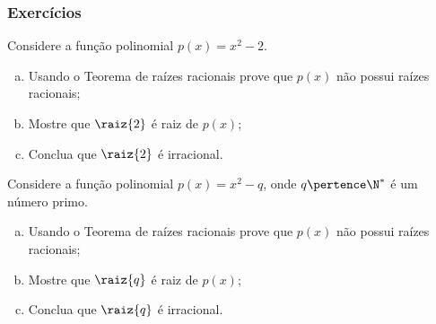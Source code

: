 \begin{frame}
\frametitle{Exercícios} 








\begin{exercise}
	Considere a função polinomial $p(x)=x^2-2$.
	\begin{enumerate}[a)]
	  \item Usando o Teorema de raízes racionais prove que $p(x)$ não possui raízes racionais;
	  \item Mostre que $\raiz{2}$ é raiz de $p(x)$;
	  \item Conclua que $\raiz{2}$ é irracional.
	\end{enumerate}
\end{exercise}

\begin{exercise}
	Considere a função polinomial $p(x)=x^2-q$, onde $q \pertence \N^\ast$ é um número primo.
	\begin{enumerate}[a)]
	  \item Usando o Teorema de raízes racionais prove que $p(x)$ não possui raízes racionais;
	  \item Mostre que $\raiz{q}$ é raiz de $p(x)$;
	  \item Conclua que $\raiz{q}$ é irracional.
  \end{enumerate}
\end{exercise}

\end{frame}




